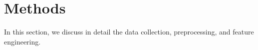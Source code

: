 
\section{Methods}\label{chapter_3:mm}
In this section, we discuss in detail the data collection, preprocessing, and feature engineering. %

